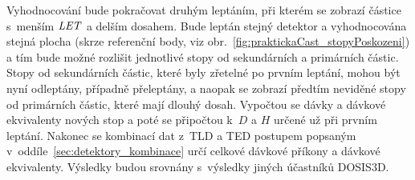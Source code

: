 Vyhodnocování bude pokračovat druhým leptáním, při kterém se zobrazí částice s~menším $\mathit{LET}$ a delším dosahem. Bude leptán stejný detektor a vyhodnocována stejná plocha (skrze referenční body, viz obr.~\ref{fig:praktickaCast_stopyPoskozeni}) a tím bude možné rozlišit jednotlivé stopy od sekundárních a primárních částic. Stopy od sekundárních částic, které byly zřetelné po prvním leptání, mohou být nyní odleptány, případně přeleptány, a naopak se zobrazí předtím neviděné stopy od primárních částic, které mají dlouhý dosah. Vypočtou se dávky a dávkové ekvivalenty nových stop a poté se připočtou k~$D$ a $H$ určené už při prvním leptání. Nakonec se kombinací dat z~TLD a TED postupem popsaným v~oddíle~\ref{sec:detektory_kombinace} určí celkové dávkové příkony a dávkové
ekvivalenty. Výsledky budou srovnány s~výsledky jiných účastníků DOSIS3D.
